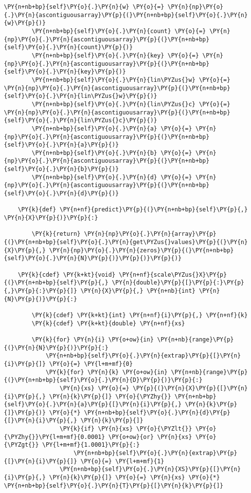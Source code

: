 \begin{Verbatim}[commandchars=\\\{\}]
        \PY{n+nb+bp}{self}\PY{o}{.}\PY{n}{w} \PY{o}{=} \PY{n}{np}\PY{o}{.}\PY{n}{ascontiguousarray}\PY{p}{(}\PY{n+nb+bp}{self}\PY{o}{.}\PY{n}{w}\PY{p}{)}
        \PY{n+nb+bp}{self}\PY{o}{.}\PY{n}{count} \PY{o}{=} \PY{n}{np}\PY{o}{.}\PY{n}{ascontiguousarray}\PY{p}{(}\PY{n+nb+bp}{self}\PY{o}{.}\PY{n}{count}\PY{p}{)}
        \PY{n+nb+bp}{self}\PY{o}{.}\PY{n}{key} \PY{o}{=} \PY{n}{np}\PY{o}{.}\PY{n}{ascontiguousarray}\PY{p}{(}\PY{n+nb+bp}{self}\PY{o}{.}\PY{n}{key}\PY{p}{)}
        \PY{n+nb+bp}{self}\PY{o}{.}\PY{n}{lin\PYZus{}w} \PY{o}{=} \PY{n}{np}\PY{o}{.}\PY{n}{ascontiguousarray}\PY{p}{(}\PY{n+nb+bp}{self}\PY{o}{.}\PY{n}{lin\PYZus{}w}\PY{p}{)}
        \PY{n+nb+bp}{self}\PY{o}{.}\PY{n}{lin\PYZus{}c} \PY{o}{=} \PY{n}{np}\PY{o}{.}\PY{n}{ascontiguousarray}\PY{p}{(}\PY{n+nb+bp}{self}\PY{o}{.}\PY{n}{lin\PYZus{}c}\PY{p}{)}
        \PY{n+nb+bp}{self}\PY{o}{.}\PY{n}{a} \PY{o}{=} \PY{n}{np}\PY{o}{.}\PY{n}{ascontiguousarray}\PY{p}{(}\PY{n+nb+bp}{self}\PY{o}{.}\PY{n}{a}\PY{p}{)}
        \PY{n+nb+bp}{self}\PY{o}{.}\PY{n}{b} \PY{o}{=} \PY{n}{np}\PY{o}{.}\PY{n}{ascontiguousarray}\PY{p}{(}\PY{n+nb+bp}{self}\PY{o}{.}\PY{n}{b}\PY{p}{)}
        \PY{n+nb+bp}{self}\PY{o}{.}\PY{n}{d} \PY{o}{=} \PY{n}{np}\PY{o}{.}\PY{n}{ascontiguousarray}\PY{p}{(}\PY{n+nb+bp}{self}\PY{o}{.}\PY{n}{d}\PY{p}{)}

    \PY{k}{def} \PY{n+nf}{predict}\PY{p}{(}\PY{n+nb+bp}{self}\PY{p}{,} \PY{n}{X}\PY{p}{)}\PY{p}{:}

        \PY{k}{return} \PY{n}{np}\PY{o}{.}\PY{n}{array}\PY{p}{(}\PY{n+nb+bp}{self}\PY{o}{.}\PY{n}{get\PYZus{}values}\PY{p}{(}\PY{n}{X}\PY{p}{,} \PY{n}{np}\PY{o}{.}\PY{n}{zeros}\PY{p}{(}\PY{n+nb+bp}{self}\PY{o}{.}\PY{n}{N}\PY{p}{)}\PY{p}{)}\PY{p}{)}

    \PY{k}{cdef} \PY{k+kt}{void} \PY{n+nf}{scale\PYZus{}X}\PY{p}{(}\PY{n+nb+bp}{self}\PY{p}{,} \PY{n}{double}\PY{p}{[}\PY{p}{:}\PY{p}{,}\PY{p}{:}\PY{p}{]} \PY{n}{X}\PY{p}{,} \PY{n+nb}{int} \PY{n}{N}\PY{p}{)}\PY{p}{:}

        \PY{k}{cdef} \PY{k+kt}{int} \PY{n+nf}{i}\PY{p}{,} \PY{n+nf}{k}
        \PY{k}{cdef} \PY{k+kt}{double} \PY{n+nf}{xs}

        \PY{k}{for} \PY{n}{i} \PY{o+ow}{in} \PY{n+nb}{range}\PY{p}{(}\PY{n}{N}\PY{p}{)}\PY{p}{:}
            \PY{n+nb+bp}{self}\PY{o}{.}\PY{n}{extrap}\PY{p}{[}\PY{n}{i}\PY{p}{]} \PY{o}{=} \PY{l+m+mf}{0}
            \PY{k}{for} \PY{n}{k} \PY{o+ow}{in} \PY{n+nb}{range}\PY{p}{(}\PY{n+nb+bp}{self}\PY{o}{.}\PY{n}{D}\PY{p}{)}\PY{p}{:}
                \PY{n}{xs} \PY{o}{=} \PY{p}{(}\PY{n}{X}\PY{p}{[}\PY{n}{i}\PY{p}{,} \PY{n}{k}\PY{p}{]} \PY{o}{\PYZhy{}} \PY{n+nb+bp}{self}\PY{o}{.}\PY{n}{a}\PY{p}{[}\PY{n}{i}\PY{p}{,} \PY{n}{k}\PY{p}{]}\PY{p}{)} \PY{o}{*} \PY{n+nb+bp}{self}\PY{o}{.}\PY{n}{d}\PY{p}{[}\PY{n}{i}\PY{p}{,} \PY{n}{k}\PY{p}{]}
                \PY{k}{if} \PY{n}{xs} \PY{o}{\PYZlt{}} \PY{o}{\PYZhy{}}\PY{l+m+mf}{0.0001} \PY{o+ow}{or} \PY{n}{xs} \PY{o}{\PYZgt{}} \PY{l+m+mf}{1.0001}\PY{p}{:}
                    \PY{n+nb+bp}{self}\PY{o}{.}\PY{n}{extrap}\PY{p}{[}\PY{n}{i}\PY{p}{]} \PY{o}{=} \PY{l+m+mf}{1}
                \PY{n+nb+bp}{self}\PY{o}{.}\PY{n}{XS}\PY{p}{[}\PY{n}{i}\PY{p}{,} \PY{n}{k}\PY{p}{]} \PY{o}{=} \PY{n}{xs} \PY{o}{*} \PY{n+nb+bp}{self}\PY{o}{.}\PY{n}{T}\PY{p}{[}\PY{n}{k}\PY{p}{]}
    

\end{Verbatim}
